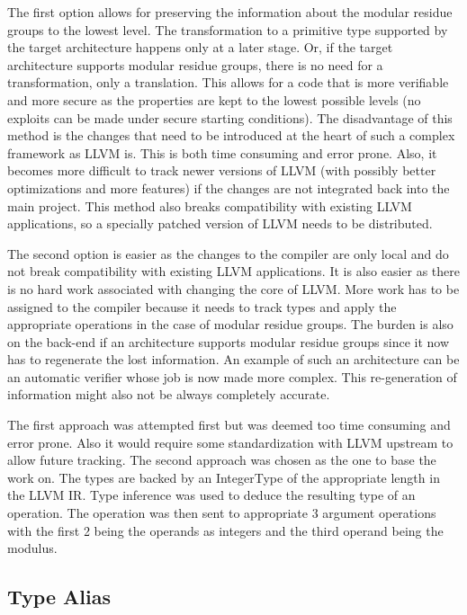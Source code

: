 The first option allows for preserving the information about the
modular residue groups to the lowest level. The transformation to a
primitive type supported by the target architecture happens only at a
later stage. Or, if the target architecture supports modular residue
groups, there is no need for a transformation, only a translation.
This allows for a code that is more verifiable and more secure as the
properties are kept to the lowest possible levels (no exploits can be
made under secure starting conditions). The disadvantage of this
method is the changes that need to be introduced at the heart of such
a complex framework as LLVM is. This is both time consuming and error
prone. Also, it becomes more difficult to track newer versions of LLVM
(with possibly better optimizations and more features) if the changes
are not integrated back into the main project. This method also breaks
compatibility with existing LLVM applications, so a specially patched
version of LLVM needs to be distributed.

The second option is easier as the changes to the compiler are only
local and do not break compatibility with existing LLVM applications.
It is also easier as there is no hard work associated with changing
the core of LLVM. More work has to be assigned to the compiler because
it needs to track types and apply the appropriate operations in the
case of modular residue groups. The burden is also on the back-end if
an architecture supports modular residue groups since it now has to
regenerate the lost information. An example of such an architecture
can be an automatic verifier whose job is now made more complex. This
re-generation of information might also not be always completely
accurate.

The first approach was attempted first but was deemed too time
consuming and error prone. Also it would require some standardization
with LLVM upstream to allow future tracking. The second approach was
chosen as the one to base the work on. The types are backed by an
IntegerType of the appropriate length in the LLVM IR. Type inference
was used to deduce the resulting type of an operation. The operation
was then sent to appropriate 3 argument operations with the first 2
being the operands as integers and the third operand being the
modulus.

\subsection{Type Alias}

